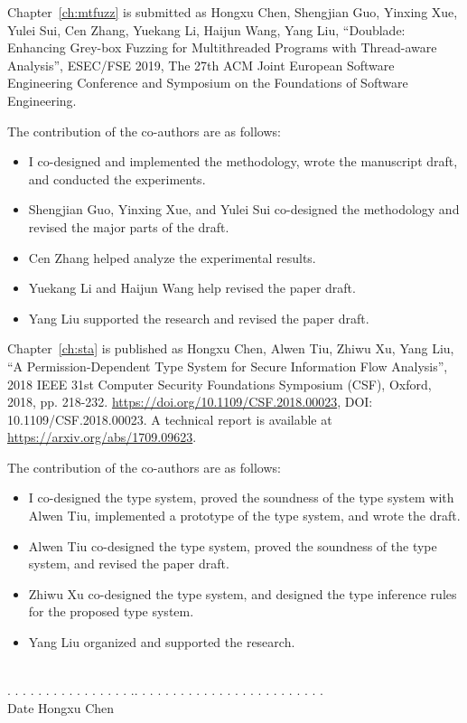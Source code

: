 \noindent Chapter~\ref{ch:mtfuzz} is submitted as Hongxu Chen, Shengjian Guo, Yinxing Xue, Yulei Sui, Cen Zhang, Yuekang Li, Haijun Wang, Yang Liu, ``Doublade: Enhancing Grey-box Fuzzing for Multithreaded Programs with Thread-aware Analysis'', ESEC/FSE 2019, The 27th ACM Joint European Software Engineering Conference and Symposium on the Foundations of Software Engineering.

\noindent The contribution of the co-authors are as follows:
\begin{itemize}
	\item I co-designed and implemented the methodology, wrote the manuscript draft, and conducted the experiments.
	\item Shengjian Guo, Yinxing Xue, and Yulei Sui co-designed the methodology and revised the major parts of the draft.
	\item Cen Zhang helped analyze the experimental results.
	\item Yuekang Li and Haijun Wang help revised the paper draft.
	\item Yang Liu supported the research and revised the paper draft.
\end{itemize}

\noindent Chapter~\ref{ch:sta} is published as Hongxu Chen, Alwen Tiu, Zhiwu Xu, Yang Liu, ``A Permission-Dependent Type System for Secure Information Flow Analysis'', 2018 IEEE 31st Computer Security Foundations Symposium (CSF), Oxford, 2018, pp. 218-232. \url{https://doi.org/10.1109/CSF.2018.00023}, DOI: 10.1109/CSF.2018.00023. A technical report is available at \url{https://arxiv.org/abs/1709.09623}.

\noindent The contribution of the co-authors are as follows:
\begin{itemize}
	\item I co-designed the type system, proved the soundness of the type system with Alwen Tiu, implemented a prototype of the type system, and wrote the draft.
	\item Alwen Tiu co-designed the type system, proved the soundness of the type system, and revised the paper draft.
	\item Zhiwu Xu co-designed the type system, and designed the type inference rules for the proposed type system.
	\item Yang Liu organized and supported the research.
\end{itemize}

\vspace{150pt}

 \ \   \qquad \qquad \qquad \qquad\qquad\qquad\qquad\qquad\quad \\
. . . . . . . . . . . . . . . . .\qquad \qquad \qquad \qquad\qquad \qquad . . . .  . . . . . . . . . . . . . . . . . . . . .\\
\indent \qquad Date \qquad \qquad \qquad  \qquad \qquad \qquad\qquad\qquad\qquad\qquad Hongxu Chen
